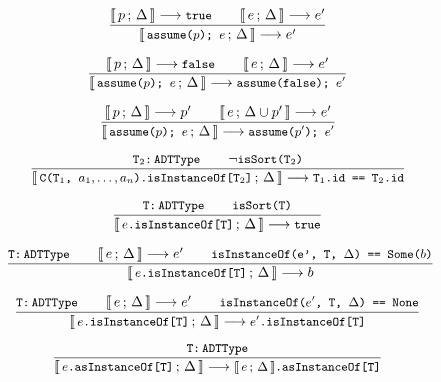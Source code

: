 \documentclass[a4paper,twoside]{article}
\newcommand{\lb}[2]{\llbracket\, #1\,;\, #2\, \rrbracket}
\newcommand{\stt}[1]{\texttt{\small{#1}}}
\begin{document}
\begin{figure}[htb]\ContinuedFloat
\centering
\begin{framed}

\begin{equation}
\dfrac{
  \lb{p}{\Delta} \longrightarrow \stt{true} \qquad
  \lb{e}{\Delta} \longrightarrow e'
}{
  \lb{\stt{assume($p$); $e$}}{\Delta} \longrightarrow e'
}
\end{equation}

\begin{equation}
\dfrac{
  \lb{p}{\Delta} \longrightarrow \stt{false} \qquad
  \lb{e}{\Delta} \longrightarrow e'
}{
  \lb{\stt{assume($p$); $e$}}{\Delta} \longrightarrow \stt{assume(false); $e'$}
}
\end{equation}

\begin{equation}
\dfrac{
  \lb{p}{\Delta} \longrightarrow p' \qquad
  \lb{e}{\Delta \cup p'} \longrightarrow e'
}{
  \lb{\stt{assume($p$); $e$}}{\Delta} \longrightarrow
  \stt{assume($p'$); $e'$}
}
\end{equation}

\begin{equation}
\dfrac{
  \stt{T$_2$:\,ADTType} \qquad
  \neg \stt{isSort(T$_2$)}
}{
  \lb{\stt{C(T$_1$, $a_1, \ldots, a_n$).isInstanceOf[T$_2$]}}{\Delta}
  \longrightarrow \stt{T$_1$.id == T$_2$.id}
}
\end{equation}

\begin{equation}
\dfrac{
  \stt{T:\,ADTType} \qquad
  \stt{isSort(T)}
}{
  \lb{\stt{$e$.isInstanceOf[T]}}{\Delta} \longrightarrow \stt{true}
}
\end{equation}

\begin{equation}
\dfrac{
  \stt{T:\,ADTType} \qquad
  \lb{e}{\Delta} \longrightarrow e' \qquad
  \stt{isInstanceOf(e', T, $\Delta$) == Some($b$)}
}{
  \lb{\stt{$e$.isInstanceOf[T]}}{\Delta} \longrightarrow b
}
\end{equation}

\begin{equation}
\dfrac{
  \stt{T:\,ADTType} \qquad
  \lb{e}{\Delta} \longrightarrow e' \qquad
  \stt{isInstanceOf($e'$, T, $\Delta$) == None}
}{
  \lb{\stt{$e$.isInstanceOf[T]}}{\Delta} \longrightarrow \stt{$e'$.isInstanceOf[T]}
}
\end{equation}

\begin{equation}
\dfrac{
  \stt{T:\,ADTType}
}{
  \lb{\stt{$e$.asInstanceOf[T]}}{\Delta} \longrightarrow \stt{$\lb{e}{\Delta}$.asInstanceOf[T]}
}
\end{equation}


\end{framed}
\end{figure}
\end{document}
